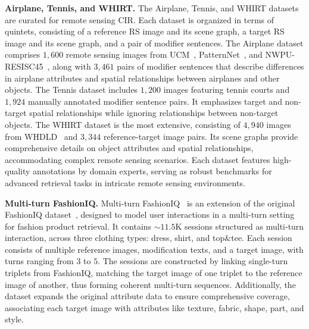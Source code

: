 \textbf{Airplane, Tennis, and WHIRT.} The Airplane, Tennis, and WHIRT datasets~\cite{shf} are curated for remote sensing CIR. 
Each dataset is organized in terms of quintets, consisting of a reference RS image and its scene graph, a target RS image and its scene graph, and a pair of modifier sentences. The Airplane dataset comprises $1,600$ remote sensing images from UCM~\cite{yang2010bag}, PatternNet~\cite{zhou2018patternnet}, and NWPU-RESISC45~\cite{cheng2017remote}, along with $3,461$ pairs of modifier sentences that describe differences in airplane attributes and spatial relationships between airplanes and other objects. The Tennis dataset includes $1,200$ images featuring tennis courts and $1,924$ manually annotated modifier sentence pairs. It emphasizes target and non-target spatial relationships while ignoring relationships between non-target objects. The WHIRT dataset is the most extensive, consisting of $4,940$ images from WHDLD~\cite{shao2018performance} and $3,344$ reference-target image pairs. Its scene graphs provide comprehensive details on object attributes and spatial relationships, accommodating complex remote sensing scenarios. Each dataset features high-quality annotations by domain experts, serving as robust benchmarks for advanced retrieval tasks in intricate remote sensing environments. 

\textbf{Multi-turn FashionIQ.} Multi-turn FashionIQ~\cite{cfir2021} is an extension of the original FashionIQ dataset~\cite{wu2021fiq}, designed to model user interactions in a multi-turn setting for fashion product retrieval. It contains $\sim11.5$K sessions structured as multi-turn interaction, across three clothing types: dress, shirt, and top\&tee. Each session consists of multiple reference images, modification texts, and a target image, with turns ranging from $3$ to $5$. The sessions are constructed by linking single-turn triplets from FashionIQ, matching the target image of one triplet to the reference image of another, thus forming coherent multi-turn sequences. Additionally, the dataset expands the original attribute data to ensure comprehensive coverage, associating each target image with attributes like texture, fabric, shape, part, and style. 

